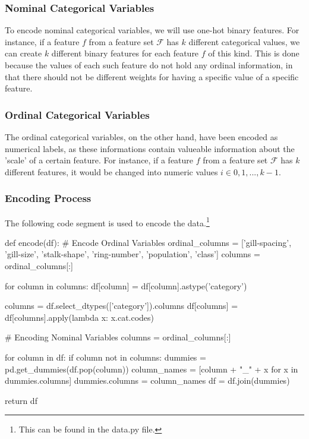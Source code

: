 \documentclass[fleqn]{article}
\begin{document}
    \subsubsection{Nominal Categorical Variables}

    To encode nominal categorical variables, we will use one-hot binary features. For
    instance, if a feature $ f $ from a feature set $ \mathcal{F} $ has $ k $ different
    categorical values, we can create $ k $ different binary features for each feature
    $ f $ of this kind. This is done because the values of each such feature do not hold
    any ordinal information, in that there should not be different weights for having a
    specific value of a specific feature.

    \subsubsection{Ordinal Categorical Variables}

    The ordinal categorical variables, on the other hand, have been encoded as numerical
    labels, as these informations contain valueable information about the 'scale' of a
    certain feature. For instance, if a feature $ f $ from a feature set $ \mathcal{F} $
    has $ k $ different features, it would be changed into numeric values
    $ i \in 0,1,...,k-1$.

    \subsubsection{Encoding Process}

    The following code segment is used to encode the data.\footnote{This can be found in
    the data.py file.}

    \begin{python}
def encode(df):
    # Encode Ordinal Variables
    ordinal_columns = ['gill-spacing', 'gill-size',
            'stalk-shape', 'ring-number', 'population', 'class']
    columns = ordinal_columns[:]

    for column in columns:
        df[column] = df[column].astype('category')

        columns = df.select_dtypes(['category']).columns
        df[columns] = df[columns].apply(lambda x: x.cat.codes)

    # Encoding Nominal Variables
    columns = ordinal_columns[:]

    for column in df:
        if column not in columns:
            dummies = pd.get_dummies(df.pop(column))
            column_names = [column + "_" + x for x in dummies.columns]
            dummies.columns = column_names
            df = df.join(dummies)

    return df
    \end{python}
\end{document}
